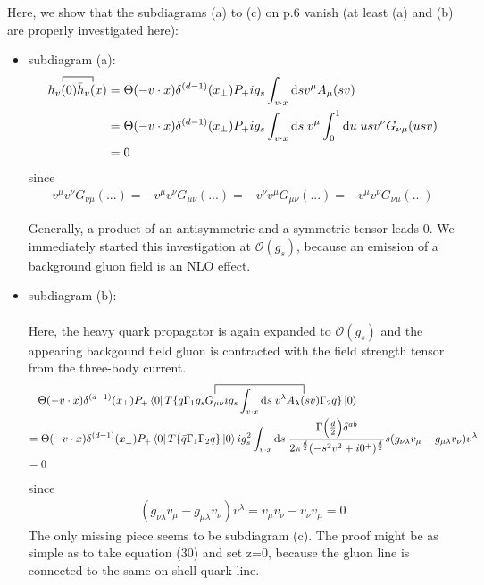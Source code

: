 \documentclass[openright,twoside,12pt,a4paper,final]{article}
\begin{document}
	\noindent 
	Here, we show that the subdiagrams (a) to (c) on p.6 vanish (at least (a) and (b) are properly investigated here):
	
	\begin{itemize}
		\item subdiagram (a):
			\begin{align}
				\contraction{}{h_v(0)}{}{\bar{h}_v(x)} h_v(0) \bar{h}_v(x)
				 =& \; \Theta(-v\cdot x) \delta^{(d - 1)}(x_{\perp}) P_+ i g_s \int_{v\cdot x} \mathrm{d} s v^{\mu} A_{\mu}(sv) \nonumber \\ =& \; \Theta(-v\cdot x) \delta^{(d - 1)}(x_{\perp}) P_+ i g_s \int_{v\cdot x} \mathrm{d} s \; v^{\mu} \int_0^1 \mathrm{d} u \;  u s v^{\nu} G_{\nu \mu}(usv) \nonumber \\ =& \; 0
			\end{align} 
			since 
			\begin{align}
				v^{\mu} v^{\nu} G_{\nu \mu}(...) = -v^{\mu} v^{\nu} G_{\mu \nu}(...) = -v^{\nu} v^{\mu} G_{\mu \nu}(...) = -v^{\mu} v^{\nu} G_{\nu \mu}(...)
			\end{align}
			
			Generally, a product of an antisymmetric and a symmetric tensor leads $0$. We immediately started this investigation at $\mathcal{O}(g_s)$, because an emission of a background gluon field is an NLO effect.
		\item subdiagram (b): \\ \\
			Here, the heavy quark propagator is again expanded to $\mathcal{O}(g_s)$ and the appearing backgound field gluon is contracted with the field strength tensor from the three-body current.
			\begin{align}
				&\Theta(-v\cdot x) \delta^{(d - 1)}(x_{\perp}) P_+ \bra{0}T\{\bar{q} \Gamma_1 g_s \contraction[2ex]{}{G_{\mu \nu}}{ i g_s \int_{v \cdot x} \mathrm{d}s \; v^{\lambda}}{A_{\lambda}(sv)} G_{\mu \nu} i g_s \int_{v \cdot x} \mathrm{d}s \; v^{\lambda} A_{\lambda}(sv) \Gamma_2 q\}\ket{0} \nonumber \\ =& \; \Theta(-v\cdot x) \delta^{(d - 1)}(x_{\perp}) P_+ \bra{0}T\{\bar{q} \Gamma_1 \Gamma_2 q\}\ket{0} i g_s^2 \int_{v \cdot x} \mathrm{d}s \; \frac{\Gamma\Big(\frac{d}{2}\Big) \delta^{ab}}{2 \pi^{\frac{d}{2}} (-s^2v^2 + i0^+)^{\frac{d}{2}}} s (g_{\nu \lambda} v_{\mu} - g_{\mu \lambda} v_{\nu}) v^{\lambda} \nonumber \\ =& \; 0
			\end{align}
			since 
			\begin{align}
				(g_{\nu \lambda} v_{\mu} - g_{\mu \lambda} v_{\nu}) v^{\lambda} = v_{\mu} v_{\nu} - v_{\nu} v_{\mu} = 0
			\end{align}
			The only missing piece seems to be subdiagram (c). The proof might be as simple as to take equation (30) and set z=0, because the gluon line is connected to the same on-shell quark line.
	\end{itemize}
	
\end{document}
